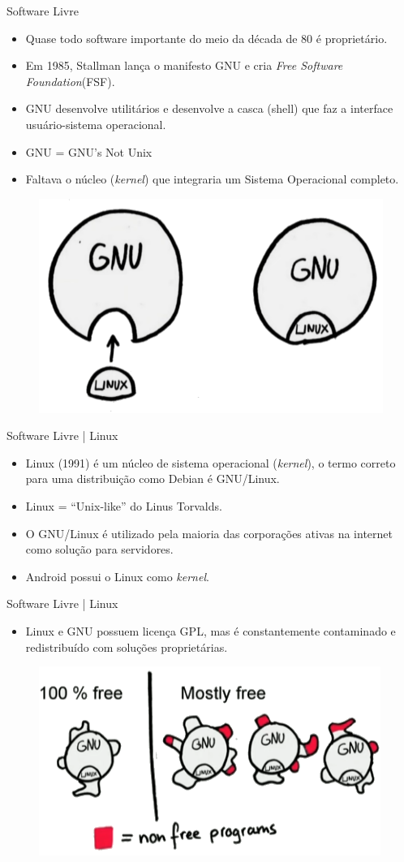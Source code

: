 \documentclass{beamer}
\begin{document}
\begin{frame}{Software Livre}
    \begin{itemize}
        \item Quase todo software importante do meio da década de 80 é proprietário.
        \item Em 1985, Stallman lança o manifesto GNU e cria \textit{Free Software Foundation}(FSF).
        \item GNU desenvolve utilitários e desenvolve a casca (shell) que faz a interface usuário-sistema operacional.
        \item GNU = GNU's Not Unix
        \item Faltava o núcleo (\textit{kernel}) que integraria um Sistema Operacional completo.
    \end{itemize}
    \begin{figure}
        \centering
        \includegraphics[width=0.4\linewidth]{img/gnulinux.png}
    \end{figure}
\end{frame}

\begin{frame}{Software Livre | Linux}
    \begin{itemize}
        \item Linux (1991) é um núcleo de sistema operacional (\textit{kernel}), o termo correto para uma distribuição como Debian é GNU/Linux.
        \item Linux = ``Unix-like'' do Linus Torvalds. 
        \item O GNU/Linux é utilizado pela maioria das corporações ativas na internet como solução para servidores.
        \item Android possui o Linux como \textit{kernel}.
    \end{itemize}
\end{frame}

\begin{frame}{Software Livre | Linux}
    \begin{itemize}
        \item Linux e GNU possuem licença GPL, mas é constantemente contaminado e redistribuído com soluções proprietárias.
    \end{itemize}
    \begin{figure}
        \centering
        \includegraphics[width=0.5\linewidth]{img/nonfree.png}
    \end{figure}
\end{frame}
\end{document}
